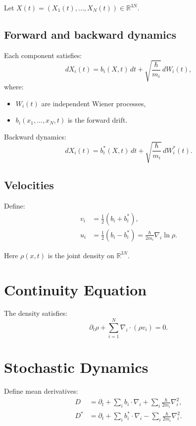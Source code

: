 \documentclass[11pt]{article}
\begin{document}
Let $X(t) = (X_1(t), \dots, X_N(t)) \in \mathbb{R}^{3N}$.

\subsection{Forward and backward dynamics}

Each component satisfies:
\begin{equation}
dX_i(t) = b_i(X,t)\, dt + \sqrt{\frac{\hbar}{m_i}}\, dW_i(t),
\end{equation}
where:
\begin{itemize}
\item $W_i(t)$ are independent Wiener processes,
\item $b_i(x_1,\dots,x_N,t)$ is the forward drift.
\end{itemize}

Backward dynamics:
\begin{equation}
dX_i(t) = b_i^*(X,t)\, dt + \sqrt{\frac{\hbar}{m_i}}\, dW_i^*(t).
\end{equation}

\subsection{Velocities}

Define:
\begin{align}
v_i &= \frac{1}{2}(b_i + b_i^*), \\
u_i &= \frac{1}{2}(b_i - b_i^*) = \frac{\hbar}{2m_i} \nabla_i \ln \rho.
\end{align}

Here $\rho(x,t)$ is the joint density on $\mathbb{R}^{3N}$.

\section{Continuity Equation}

The density satisfies:
\begin{equation}
\partial_t \rho + \sum_{i=1}^N \nabla_i \cdot (\rho v_i) = 0.
\end{equation}

\section{Stochastic Dynamics}

Define mean derivatives:
\begin{align}
D &= \partial_t + \sum_i b_i \cdot \nabla_i + \sum_i \frac{\hbar}{2m_i} \nabla_i^2, \\
D^* &= \partial_t + \sum_i b_i^* \cdot \nabla_i - \sum_i \frac{\hbar}{2m_i} \nabla_i^2.
\end{align}
\end{document}
